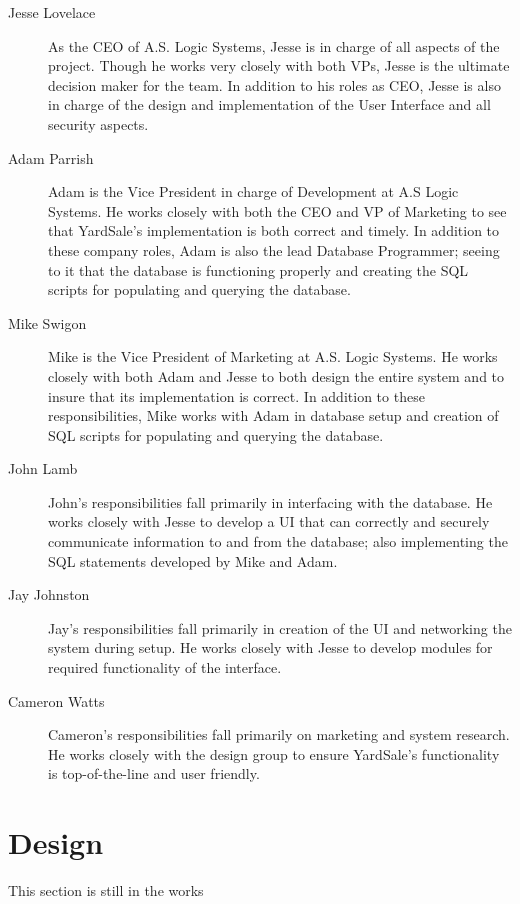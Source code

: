 \documentclass{report}
\begin{document}
    \begin{description}
        \item[Jesse Lovelace] As the CEO of A.S. Logic Systems,
        Jesse is in charge of all aspects of the project.  Though
        he works very closely with both VPs, Jesse is the ultimate
        decision maker for the team.  In addition to his roles as
        CEO, Jesse is also in charge of the design and
        implementation of the User Interface and all security
        aspects.
        \item[Adam Parrish] Adam is the Vice President in charge
        of Development at A.S Logic Systems.  He works closely
        with both the CEO and VP of Marketing to see that
        YardSale's implementation is both correct and timely.  In
        addition to these company roles, Adam is also the lead
        Database Programmer; seeing to it that the database is
        functioning properly and creating the SQL scripts for
        populating and querying the database.
        \item[Mike Swigon] Mike is the Vice President of
        Marketing at A.S. Logic Systems.  He works closely with
        both Adam and Jesse to both design the entire system and
        to insure that its implementation is correct.  In addition
        to these responsibilities, Mike works with Adam in database
        setup and creation of SQL scripts for populating and
        querying the database.
        \item[John Lamb] John's responsibilities fall primarily in
        interfacing with the database.  He works closely with Jesse
        to develop a UI that can correctly and securely
        communicate information to and from the database; also
        implementing the SQL statements developed by Mike and
        Adam.
        \item[Jay Johnston] Jay's responsibilities fall primarily
        in creation of the UI and networking the system during
        setup.  He works closely with Jesse to develop modules
        for required functionality of the interface.
        \item[Cameron Watts] Cameron's responsibilities fall
        primarily on marketing and system research.  He works
        closely with the design group to ensure YardSale's
        functionality is top-of-the-line and user friendly.
    \end{description}


\chapter{Design}
This section is still in the works
\end{document}
